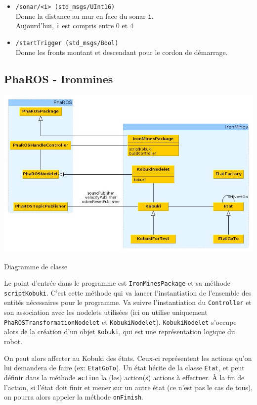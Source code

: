 \documentclass[a4paper, 11pt]{article}
\begin{document}
\begin{itemize}
\item \texttt{/sonar/<i> (std\_msgs/UInt16)}\\
  Donne la distance au mur en face du sonar \texttt{i}.\\
  Aujourd'hui, \texttt{i} est compris entre 0 et 4
\item \texttt{/startTrigger (std\_msgs/Bool)}\\ 
  Donne les fronts montant et descendant pour le cordon de démarrage.
\end{itemize}

\subsection{PhaROS - Ironmines}

\begin{center}
  \includegraphics[width=\linewidth]{./UMLClass.jpg}
  \caption{Diagramme de classe}
  \label{dia_class}
\end{center}

Le point d'entrée dans le programme est \texttt{IronMinesPackage} et
sa méthode \texttt{scriptKobuki}. C'est cette méthode qui va lancer
l'instantiation de l'ensemble des entités nécessaires pour le
programme. Va suivre l'instantiation du \texttt{Controller} et son
association avec les nodelets utilisées (ici on utilise uniquement
\texttt{PhaROSTransformationNodelet} et
\texttt{KobukiNodelet}). \texttt{KobukiNodelet} s'occupe alors de la
création d'un objet \texttt{Kobuki}, qui est une représentation
logique du robot.

On peut alors affecter au Kobuki des états. Ceux-ci représentent les
actions qu'on lui demandera de faire (ex: \texttt{EtatGoTo}). Un état
hérite de la classe \texttt{Etat}, et peut définir dans la méthode
\texttt{action} la (les) action(s) actions à effectuer. À la fin de
l'action, si l'état doit finir et mener sur un autre état (ce n'est
pas le cas de tous), on pourra alors appeler la méthode
\texttt{onFinish}. 
\end{document}
